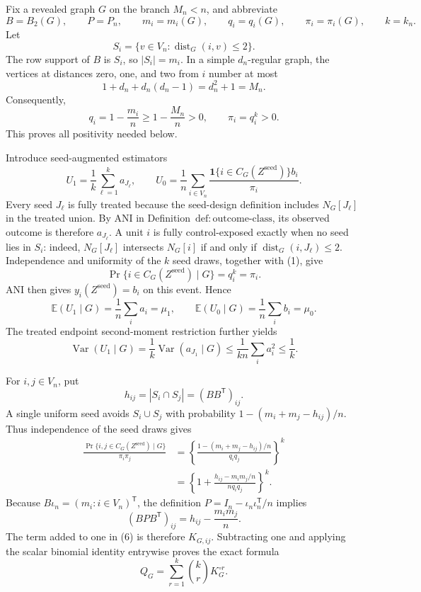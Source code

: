 Fix a revealed graph \(G\) on the branch \(M_n<n\), and abbreviate
\[
B=B_2(G),\qquad P=P_n,\qquad m_i=m_i(G),\qquad
q_i=q_i(G),\qquad \pi_i=\pi_i(G),\qquad k=k_n.
\]
Let
\[
S_i=\{v\in V_n:\operatorname{dist}_G(i,v)\le 2\}.
\]
The row support of \(B\) is \(S_i\), so \(|S_i|=m_i\).  In a simple
\(d_n\)-regular graph, the vertices at distances zero, one, and two from
\(i\) number at most
\[
1+d_n+d_n(d_n-1)=d_n^2+1=M_n.
\]
Consequently,
\[
q_i=1-\frac{m_i}{n}\ge 1-\frac{M_n}{n}>0,
\qquad
\pi_i=q_i^k>0.
\tag{1}
\]
This proves all positivity needed below.

Introduce seed-augmented estimators
\[
U_1=\frac1k\sum_{\ell=1}^k a_{J_\ell},
\qquad
U_0=\frac1n\sum_{i\in V_n}
\frac{\mathbf 1\{i\in C_G(Z^{\mathrm{seed}})\}b_i}{\pi_i}.
\tag{2}
\]
Every seed \(J_\ell\) is fully treated because the seed-design definition
includes \(N_G[J_\ell]\) in the treated union.  By ANI in
Definition~\(\mathrm{def{:}outcome\mbox{-}class}\), its observed outcome is
therefore \(a_{J_\ell}\).  A unit \(i\) is fully control-exposed exactly when
no seed lies in \(S_i\): indeed, \(N_G[J_\ell]\) intersects \(N_G[i]\) if
and only if \(\operatorname{dist}_G(i,J_\ell)\le2\).  Independence and
uniformity of the \(k\) seed draws, together with (1), give
\[
\Pr\{i\in C_G(Z^{\mathrm{seed}})\mid G\}=q_i^k=\pi_i.
\tag{3}
\]
ANI then gives \(y_i(Z^{\mathrm{seed}})=b_i\) on this event.  Hence
\[
\mathbb E(U_1\mid G)=\frac1n\sum_i a_i=\mu_1,
\qquad
\mathbb E(U_0\mid G)=\frac1n\sum_i b_i=\mu_0.
\tag{4}
\]
The treated endpoint second-moment restriction further yields
\[
\operatorname{Var}(U_1\mid G)
=\frac1k\operatorname{Var}(a_{J_1}\mid G)
\le \frac1{kn}\sum_i a_i^2
\le \frac1k.
\tag{5}
\]

For \(i,j\in V_n\), put
\[
h_{ij}=|S_i\cap S_j|=(BB^{\mathsf T})_{ij}.
\]
A single uniform seed avoids \(S_i\cup S_j\) with probability
\(1-(m_i+m_j-h_{ij})/n\).  Thus independence of the seed draws gives
\[
\begin{aligned}
\frac{\Pr\{i,j\in C_G(Z^{\mathrm{seed}})\mid G\}}{\pi_i\pi_j}
&=\left\{\frac{1-(m_i+m_j-h_{ij})/n}{q_iq_j}\right\}^{k}\\
&=\left\{1+\frac{h_{ij}-m_im_j/n}{nq_iq_j}\right\}^{k}.
\end{aligned}
\tag{6}
\]
Because \(B\iota_n=(m_i:i\in V_n)^{\mathsf T}\), the definition
\(P=I_n-\iota_n\iota_n^{\mathsf T}/n\) implies
\[
(BPB^{\mathsf T})_{ij}=h_{ij}-\frac{m_im_j}{n}.
\]
The term added to one in (6) is therefore \(K_{G,ij}\).  Subtracting one
and applying the scalar binomial identity entrywise proves the exact formula
\[
Q_G=\sum_{r=1}^{k}\binom{k}{r}K_G^{\circ r}.
\tag{7}
\]


